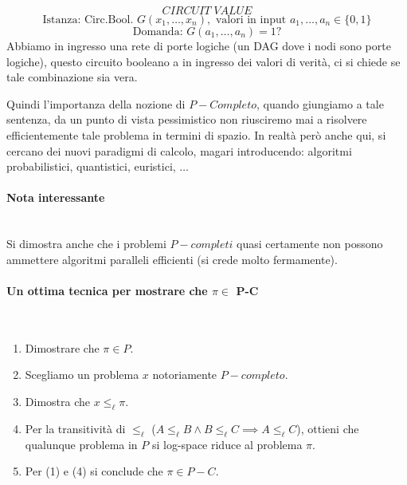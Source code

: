 \documentclass{article}
\begin{document}
$$CIRCUIT\;VALUE$$
$$\text{Istanza: Circ.Bool. }G(x_1,\dots,x_n),\text{ valori in input }a_1,\dots,a_n\in \{0,1\}$$
$$\text{Domanda: }G(a_1,\dots,a_n)=1?$$
Abbiamo in ingresso una rete di porte logiche (un DAG dove i nodi sono porte logiche), questo
circuito booleano a in ingresso dei valori di verità, ci si chiede se tale combinazione sia
vera.

Quindi l'importanza della nozione di $P-Completo$, quando giungiamo a tale sentenza, da un punto
di vista pessimistico non riusciremo mai a risolvere efficientemente tale problema in termini di spazio.
In realtà però anche qui, si cercano dei nuovi paradigmi di calcolo, magari introducendo:
algoritmi probabilistici, quantistici, euristici, $\dots$

\paragraph{Nota interessante}\mbox{}\\
Si dimostra anche che i problemi $P-completi$ quasi certamente non possono ammettere
algoritmi paralleli efficienti (si crede molto fermamente).


\paragraph{Un ottima tecnica per mostrare che $\pi\in$ P-C}\mbox{}\\
\begin{enumerate}
    \item Dimostrare che $\pi\in P$.
    \item Scegliamo un problema $x$ notoriamente $P-completo$.
    \item Dimostra che $x\leq_{\ell}\pi$.
    \item Per la transitività di $\leq_{\ell}$ ($A\leq_{\ell}B\land B\leq_{\ell} C\implies A\leq_{\ell}C$),
          ottieni che qualunque problema in $P$ si log-space riduce al problema $\pi$.
    \item Per (1) e (4) si conclude che $\pi\in P-C$.
\end{enumerate}
\end{document}
